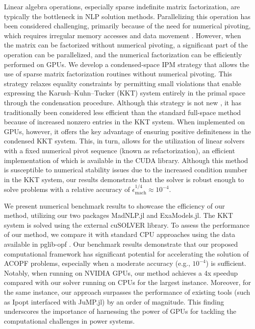 \documentclass{IEEEtran4PSCC} %
\begin{document}
Linear algebra operations, especially sparse indefinite matrix
factorization, are typically the bottleneck in NLP solution methods.
Parallelizing this operation has been considered challenging,
primarily because of the need for numerical pivoting, which requires irregular
memory accesses and data movement \cite{swirydowicz2022linear}. However, when the matrix can be factorized without
numerical pivoting, a significant part of the operation can be
parallelized, and the numerical factorization can be efficiently
performed on GPUs. We develop a condensed-space IPM strategy that
allows the use of sparse matrix factorization routines without
numerical pivoting. This strategy relaxes equality constraints by
permitting small violations that enable expressing the
Karush--Kuhn--Tucker (KKT) system entirely in the primal space through
the condensation procedure. Although this strategy is not new
\cite{nocedal2006numerical}, it has traditionally been considered less
efficient than the standard full-space method because of increased nonzero
entries in the KKT system. When implemented on GPUs, however, it
offers the key advantage of ensuring positive definiteness in the
condensed KKT system. This, in turn, allows for the utilization
of linear solvers with a fixed numerical pivot sequence (known as
refactorization), an efficient implementation of which is available in the CUDA library.
Although this method is susceptible to numerical stability issues due to
the increased condition number in the KKT system, our results demonstrate
that the solver is robust enough to solve problems with a relative
accuracy of $\epsilon_{\text{mach}}^{1/4}\approx 10^{-4}$.

We present numerical benchmark results to showcase the efficiency of
our method, utilizing our two packages MadNLP.jl and
ExaModels.jl. The  KKT system is solved using the
external cuSOLVER library. To assess the performance of our method, we
compare it with standard CPU approaches using the data available in
pglib-opf \cite{babaeinejadsarookolaee2019power}.  Our benchmark results
demonstrate that our proposed computational framework has significant
potential for accelerating the solution of ACOPF problems, especially
when a moderate accuracy (e.g., $10^{-4}$) is sufficient.
Notably, when running on NVIDIA GPUs, our method achieves a
4x speedup compared with our solver running on CPUs for
the largest instance. Moreover, for the same instance, our approach
surpasses the performance of existing tools (such as Ipopt interfaced
with JuMP.jl) by an order of magnitude. This finding underscores the
importance of harnessing the power of GPUs for tackling
the computational challenges in power systems.
\end{document}
